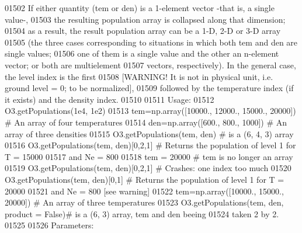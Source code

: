 \begin{DoxyCode}
{{01502 \textcolor{stringliteral}{        If either quantity (tem or den) is a 1-element vector -that is, a single value-, }
01503 \textcolor{stringliteral}{            the resulting population array is collapsed along that dimension; }
01504 \textcolor{stringliteral}{            as a result, the result population array can be a 1-D, 2-D or 3-D array }
01505 \textcolor{stringliteral}{            (the three cases corresponding to situations in which both tem and den are single values; }
01506 \textcolor{stringliteral}{            one of them is a single value and the other an n-element vector; or both are multielement }
01507 \textcolor{stringliteral}{            vectors, respectively). In the general case, the level index is the first }
01508 \textcolor{stringliteral}{            [WARNING! It is not in physical unit, i.e. ground level = 0; to be normalized], }
01509 \textcolor{stringliteral}{            followed by the temperature index (if it exists) and the density index. }
01510 \textcolor{stringliteral}{}
01511 \textcolor{stringliteral}{        Usage:}
01512 \textcolor{stringliteral}{            O3.getPopulations(1e4, 1e2)}
01513 \textcolor{stringliteral}{            tem=np.array([10000., 12000., 15000., 20000]) # An array of four temperatures}
01514 \textcolor{stringliteral}{            den=np.array([600., 800., 1000])      # An array of three densities}
01515 \textcolor{stringliteral}{            O3.getPopulations(tem, den)           # is a (6, 4, 3) array}
01516 \textcolor{stringliteral}{            O3.getPopulations(tem, den)[0,2,1]    # Returns the population of level 1 for T = 15000 }
01517 \textcolor{stringliteral}{                                                    and Ne = 800}
01518 \textcolor{stringliteral}{            tem = 20000                           # tem is no longer an array}
01519 \textcolor{stringliteral}{            O3.getPopulations(tem, den)[0,2,1]  # Crashes: one index too much}
01520 \textcolor{stringliteral}{            O3.getPopulations(tem, den)[0,1]    # Returns the population of level 1 for T = 20000 }
01521 \textcolor{stringliteral}{                                                    and Ne = 800 [see warning]}
01522 \textcolor{stringliteral}{            tem=np.array([10000., 15000., 20000]) # An array of three temperatures}
01523 \textcolor{stringliteral}{            O3.getPopulations(tem, den, product = False)# is a (6, 3) array, tem and den beeing }
01524 \textcolor{stringliteral}{                                                            taken 2 by 2.}
01525 \textcolor{stringliteral}{        }
01526 \textcolor{stringliteral}{        Parameters:}
}}
\end{DoxyCode}
